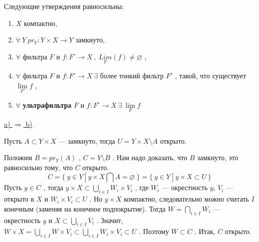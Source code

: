 \SSsect[!] Следующие утверждения равносильны:
\begin{enumerate}[label={\alph*)}]
\item \( X \) компактно,
\item \( \forall~ Y ~ pr_Y: Y \times X \rightarrow Y \) замкнуто,
\item \( \forall \) фильтра \( F \) и \( f:F^{\circ} \rightarrow X ~,~ \underset{F}{Lim}(f) \neq \varnothing \) ,
\item \( \forall \) фильтра \( F \) и \( f:F^{\circ} \rightarrow X ~\exists \) более тонкий фильтр \( F' \) , такой, что существует \( \lim\limits_{F'} f \) ,
\item \( \forall \) \textbf{ультрафильтра} \( F \) и \( f:F^{\circ} \rightarrow X ~\exists~ \lim\limits_{F} f \)
\end{enumerate}

\SSproof

\underline{a) \( \Rightarrow \) b)}
\vspace

Пусть \( A \subset Y \times X \) --- замкнуто, тогда \( U = Y \times X \setminus A \) открыто.


Положим \( B = pr_Y(A) \) , \( C = Y \setminus B \) . Нам надо доказать, что \( B \) замкнуто, это равносильно тому, что \( C \) открыто.
\[ C = \{~y \in Y~|~y \times X \bigcap A = \varnothing ~\} = \{~y \in Y~|~y \times X \subset U ~\} \]
Пусть \( y \in C \) , тогда \( y \times X \subset \underset{i \in I}{\bigcup} W_i \times V_i \) , где \( W_i \) --- окрестность \( y \), \( V_i \) --- открыто в \( X \) и \( W_i \times V_i \subset U \) . Но \( y \times X \) компактно, следовательно можно считать \( I \) конечным (заменяя на конечное подпокрытие). Тогда \( W = \underset{i \in I}{\bigcap} W_i \) --- окрестность \( y \) и \( X \subset \underset{i \in I}{\bigcup} V_i \) . Значит, \( W \times X = \underset{i \in I}{\bigcup} W \times V_i \subset \underset{i \in I}{\bigcup} W_i \times V_i \subset U \) . Поэтому \( W \subset C \) . Итак, \( C \) открыто.

